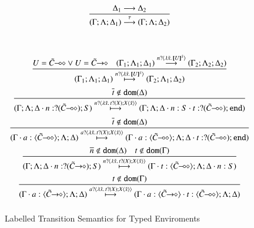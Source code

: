 \begin{figure}
\[\begin{array}{c}
		\tree{
			\Delta_1 \red \Delta_2
		}{
			(\Gamma; \Lambda; \Delta_1) \by{\tau} (\Gamma; \Lambda; \Delta_2)
		}

		\vspace{12mm}\\

		\tree{
			U = \lhot{\tilde{C}} \vee U = \shot{\tilde{C}}
			\quad
			(\Gamma_1; \Lambda_1; \Delta_1) \by{\bactinp{n}{\abs{\tilde{x}}{\map{U}^{\tilde{x}}}}} (\Gamma_2; \Lambda_2; \Delta_2)
		}{
			(\Gamma_1; \Lambda_1; \Delta_1) \hby{\bactinp{n}{\abs{\tilde{x}}{\map{U}^{\tilde{x}}}}} (\Gamma_2; \Lambda_1; \Delta_2)
		}
		\\[6mm]

		\tree{
			\dual{t} \notin \dom{\Delta}
		}{
			(\Gamma; \Lambda; \Delta \cat n: \btinp{\lhot{\tilde{C}}} S) \hby{\bactinp{n}{\abs{\tilde{x}}{\binp{t}{X} \appl{X}{\tilde{x}}}}} (\Gamma; \Lambda; \Delta \cat n: S \cat t: \btinp{\lhot{\tilde{C}}} \tinact)
		}
		\\[6mm]


		\tree{
			\dual{t} \notin \dom{\Delta}
		}{
		(\Gamma \cat a: \chtype{\lhot{\tilde{C}}}; \Lambda; \Delta) \hby{\bactinp{a}{\abs{\tilde{x}}{\binp{t}{X} \appl{X}{\tilde{x}}}}} (\Gamma \cat a: \chtype{\lhot{\tilde{C}}}; \Lambda; \Delta \cat t: \btinp{\lhot{\tilde{C}}}
 \tinact)
		}
		\\[6mm]

		\tree{
			\dual{n} \notin \dom{\Delta} \quad t \notin \dom{\Gamma}
		}{
			(\Gamma; \Lambda; \Delta \cat n: \btinp{\shot{\tilde{C}}} S) \hby{\bactinp{n}{\abs{\tilde{x}}{\binp{t}{X} \appl{X}{\tilde{x}}}}} (\Gamma \cat t: \chtype{\lhot{\tilde{C}}}; \Lambda; \Delta \cat n: S)
		}
		\\[6mm]
		\tree{
			t \notin \dom{\Gamma}
		}{
			(\Gamma \cat a: \chtype{\shot{\tilde{C}}}; \Lambda; \Delta) \hby{\bactinp{a}{\abs{\tilde{x}}{\binp{t}{X} \appl{X}{\tilde{x}}}}} (\Gamma \cat a: \chtype{\shot{\tilde{C}}} \cat t: \chtype{\lhot{\tilde{C}}}; \Lambda; \Delta)
		}
		\\[6mm]
	\end{array}
	\]
	\caption{Labelled Transition Semantics for Typed Enviroments \label{fig:envLTS}}
\end{figure}
